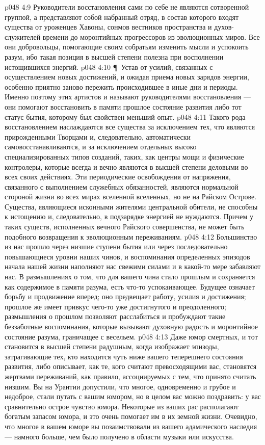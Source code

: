 \vs p048 4:9 Руководители восстановления сами по себе не являются сотворенной группой, а представляют собой набранный отряд, в состав которого входят существа от уроженцев Хавоны, сонмов вестников пространства и духов\hyp{}служителей времени до моронтийных прогрессоров из эволюционных миров. Все они добровольцы, помогающие своим собратьям изменить мысли и успокоить разум, ибо такая позиция в высшей степени полезна при восполнении истощившихся энергий.
\vs p048 4:10 \P\ Устав от усилий, связанных с осуществлением новых достижений, и ожидая приема новых зарядов энергии, особенно приятно заново пережить происходившее в иные дни и периоды.  Именно поэтому этих артистов и называют руководителями восстановления --- они помогают восстановить в памяти прошлое состояние развития либо тот статус бытия, которому был свойствен меньший опыт.
\vs p048 4:11 Такого рода восстановлением наслаждаются все существа за исключением тех, что являются прирожденными Творцами и, следовательно, автоматически самовосстанавливаются, и за исключением отдельных высоко специализированных типов созданий, таких, как центры мощи и физические контролеры, которые всегда и вечно являются в высшей степени деловыми во всех своих действиях. Эти периодические освобождения от напряжения, связанного с выполнением служебных обязанностей, являются нормальной стороной жизни во всех мирах вселенной вселенных, но не на Райском Острове. Существа, являющиеся исконными жителями центральной обители, не способны к истощению и, следовательно, в подзарядке энергией не нуждаются. Причем у таких существ, исполненных вечного Райского совершенства, не может быть подобного возвращения к эволюционным переживаниям.
\vs p048 4:12 Большинство из нас прошло через низшие ступени бытия или через последовательно повышающиеся уровни наших чинов, и воспоминания определенных эпизодов начала нашей жизни наполняют нас свежими силами и в какой\hyp{}то мере забавляют нас. В размышлениях о том, что для вашего чина стало прошлым и сохраняется как содержимое в памяти разума, есть что\hyp{}то успокаивающее. Будущее означает борьбу и продвижение вперед; оно предвещает работу, усилия и достижения; прошлое же имеет привкус чего\hyp{}то уже достигнутого и преодоленного; размышления о прошлом позволяют расслабиться и пробуждают такие беззаботные воспоминания, которые вызывают духовную радость и моронтийное состояние разума, граничащее с весельем.
\vs p048 4:13 Даже юмор смертных, и тот становится в высшей степени радушным, когда изображает эпизоды, затрагивающие тех, кто находится чуть ниже вашего теперешнего состояния развития, либо описывает, как те, кого считают превосходящими вас, становятся жертвами переживаний, как правило, ассоциируемых с тем, что принято считать низшим. Вы на Урантии допустили, что многое, одновременно и грубое и недоброе, стали путать с вашим юмором, но в целом вас можно поздравить: у вас сравнительно острое чувство юмора. Некоторые из ваших рас располагают богатым запасом юмора, и это очень помогает им в их земной жизни. Очевидно, что многое в вашем юморе вы позаимствовали из вашего адамического наследия --- намного больше, чем было получено в области музыки или искусства.

